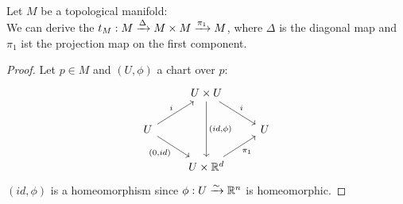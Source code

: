 \\ Let $M$ be a topological manifold:
\\ We can derive the  $t_M: M \xrightarrow{\Delta} M \times M \xrightarrow{\pi_1} M{}$, where
$\Delta$ is the diagonal map and $\pi_1$ ist the projection map on the first component.

\begin{proof}
    Let $p \in M$ and $(U, \phi)$ a chart over $p$:
    \[\begin{tikzcd}
        & U \times U \ar[dr, "i"] \ar[dd, "{(id, \phi)}"] & \\
        U \ar[ur, "i"] \ar[dr, "{(0, id)}"'] & & U \\
        & U \times \R^d \ar[ur, "\pi_1"'] &
    \end{tikzcd}\]
    $(id, \phi)$ is a homeomorphism since $\phi: U \xrightarrow{\sim} \mathbb{R}^n$ is homeomorphic.
\end{proof}